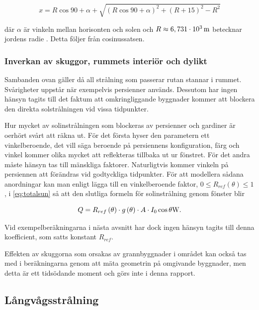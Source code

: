 \begin{equation}
x = R\cos{90+\alpha} + \sqrt{\left(R\cos{90+\alpha}\right)^2 + \left( R+15\right)^2 - R^2}
\end{equation}

där $\alpha$ är vinkeln mellan horisonten och solen och $R\approx\unit[6,731\cdot 10^3]{m}$ betecknar jordens radie \cite{physicshandbook}. Detta följer från cosinussatsen. %

\subsubsection{Inverkan av skuggor, rummets interiör och dylikt}

Sambanden ovan gäller då all strålning som passerar rutan stannar i rummet. Svårigheter uppstår när exempelvis persienner används. Dessutom har ingen hänsyn tagits till det faktum att omkringliggande byggnader kommer att blockera den direkta solstrålningen vid vissa tidpunkter.

Hur mycket av solinstrålningen som blockeras av persienner och gardiner är oerhört svårt att räkna ut. För det första hyser den parametern ett vinkelberoende, det vill säga beroende på persiennens konfiguration, färg och vinkel kommer olika mycket att reflekteras tillbaka ut ur fönstret. För det andra måste hänsyn tas till mänskliga faktorer. Naturligtvis kommer vinkeln på persiennen att förändras vid godtyckliga tidpunkter. För att modellera sådana anordningar kan man enligt \cite{ASHRAE09} lägga till en vinkelberoende faktor, $0 \le R_{ref}\left( \theta \right) \le 1$, i \eqref{eq:totalsun} så att den slutliga formeln för solinstrålning genom fönster blir


\begin{equation}\label{eq:totalsunblinds}
Q = R_{ref}\left( \theta \right) \cdot g\left( \theta \right) \cdot A \cdot I_0 \cos{\theta} \unit[]{W}.
\end{equation}

Vid exempelberäkningarna i nästa avsnitt har dock ingen hänsyn tagits till denna koefficient, som satts konstant $R_{ref}$.

Effekten av skuggorna som orsakas av grannbyggnader i området kan också tas med i beräkningarna genom att mäta geometrin på omgivande byggnader, men detta är ett tidsödande moment och görs inte i denna rapport.

\subsection{Långvågsstrålning}\label{subsec:IRmethod}

